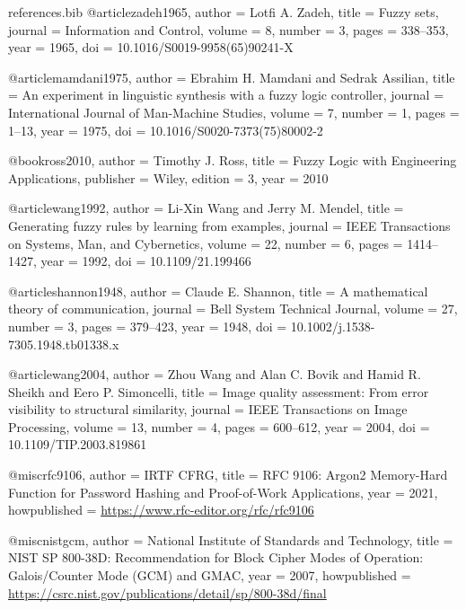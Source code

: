 \begin{filecontents*}{references.bib}
@article{zadeh1965,
  author    = {Lotfi A. Zadeh},
  title     = {Fuzzy sets},
  journal   = {Information and Control},
  volume    = {8},
  number    = {3},
  pages     = {338--353},
  year      = {1965},
  doi       = {10.1016/S0019-9958(65)90241-X}
}

@article{mamdani1975,
  author    = {Ebrahim H. Mamdani and Sedrak Assilian},
  title     = {An experiment in linguistic synthesis with a fuzzy logic controller},
  journal   = {International Journal of Man-Machine Studies},
  volume    = {7},
  number    = {1},
  pages     = {1--13},
  year      = {1975},
  doi       = {10.1016/S0020-7373(75)80002-2}
}

@book{ross2010,
  author    = {Timothy J. Ross},
  title     = {Fuzzy Logic with Engineering Applications},
  publisher = {Wiley},
  edition   = {3},
  year      = {2010}
}

@article{wang1992,
  author    = {Li-Xin Wang and Jerry M. Mendel},
  title     = {Generating fuzzy rules by learning from examples},
  journal   = {IEEE Transactions on Systems, Man, and Cybernetics},
  volume    = {22},
  number    = {6},
  pages     = {1414--1427},
  year      = {1992},
  doi       = {10.1109/21.199466}
}

@article{shannon1948,
  author    = {Claude E. Shannon},
  title     = {A mathematical theory of communication},
  journal   = {Bell System Technical Journal},
  volume    = {27},
  number    = {3},
  pages     = {379--423},
  year      = {1948},
  doi       = {10.1002/j.1538-7305.1948.tb01338.x}
}

@article{wang2004,
  author    = {Zhou Wang and Alan C. Bovik and Hamid R. Sheikh and Eero P. Simoncelli},
  title     = {Image quality assessment: From error visibility to structural similarity},
  journal   = {IEEE Transactions on Image Processing},
  volume    = {13},
  number    = {4},
  pages     = {600--612},
  year      = {2004},
  doi       = {10.1109/TIP.2003.819861}
}

@misc{rfc9106,
  author       = {{IRTF CFRG}},
  title        = {{RFC 9106}: Argon2 Memory-Hard Function for Password Hashing and Proof-of-Work Applications},
  year         = {2021},
  howpublished = {\url{https://www.rfc-editor.org/rfc/rfc9106}}
}

@misc{nistgcm,
  author       = {{National Institute of Standards and Technology}},
  title        = {{NIST SP 800-38D}: Recommendation for Block Cipher Modes of Operation: Galois/Counter Mode (GCM) and GMAC},
  year         = {2007},
  howpublished = {\url{https://csrc.nist.gov/publications/detail/sp/800-38d/final}}
}


\end{filecontents*}
